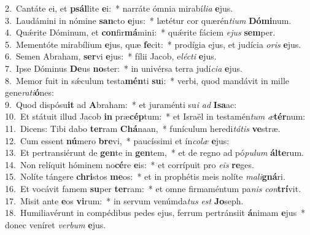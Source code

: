 {2.~}Cantáte ei, et \textbf{psál}lite \textbf{e}i:~* narráte ómnia mirabí\textit{li}\textit{a} \textbf{e}jus.\\
{3.~}Laudámini in nómine \textbf{san}cto \textbf{e}jus:~* lætétur cor quærén\textit{ti}\textit{um} \textbf{Dó}\textbf{mi}num.\\
{4.~}Quǽrite Dóminum, et \textbf{con}fir\textbf{má}mini:~* quǽrite fáciem \textit{e}\textit{jus} \textbf{sem}per.\\
{5.~}Mementóte mirabílium \textbf{e}jus, quæ \textbf{fe}cit:~* prodígia ejus, et judícia \textit{o}\textit{ris} \textbf{e}jus.\\
{6.~}Semen Abraham, \textbf{ser}vi \textbf{e}jus:~* fílii Jacob, e\textit{lé}\textit{cti} \textbf{e}jus.\\
{7.~}Ipse Dóminus \textbf{De}us \textbf{no}ster:~* in univérsa terra judí\textit{ci}\textit{a} \textbf{e}jus.\\
{8.~}Memor fuit in sǽculum testa\textbf{mén}ti \textbf{su}i:~* verbi, quod mandávit in mille gene\textit{ra}\textit{ti}\textbf{ó}nes:\\
{9.~}Quod dispósu\textbf{it} ad \textbf{A}braham:~* et juraménti su\textit{i} \textit{ad} \textbf{I}\textbf{sa}ac:\\
{10.~}Et státuit illud Jacob \textbf{in} præ\textbf{cép}tum:~* et Israël in testamén\textit{tum} \textit{æ}\textbf{tér}num:\\
{11.~}Dicens: Tibi dabo \textbf{ter}ram \textbf{Chá}naan,~* funículum heredi\textit{tá}\textit{tis} \textbf{ve}stræ.\\
{12.~}Cum essent \textbf{nú}mero \textbf{bre}vi,~* paucíssimi et ín\textit{co}\textit{læ} \textbf{e}jus:\\
{13.~}Et pertransiérunt de \textbf{gen}te in \textbf{gen}tem,~* et de regno ad pó\textit{pu}\textit{lum} \textbf{ál}\textbf{te}rum.\\
{14.~}Non relíquit hóminem no\textbf{cé}re \textbf{e}is:~* et corrípuit pro \textit{e}\textit{is} \textbf{re}ges.\\
{15.~}Nolíte tángere \textbf{chri}stos \textbf{me}os:~* et in prophétis meis nolíte \textit{ma}\textit{li}\textbf{gná}ri.\\
{16.~}Et vocávit famem \textbf{su}per \textbf{ter}ram:~* et omne firmaméntum pa\textit{nis} \textit{con}\textbf{trí}vit.\\
{17.~}Misit ante \textbf{e}os \textbf{vi}rum:~* in servum venúmda\textit{tus} \textit{est} \textbf{Jo}seph.\\
{18.~}Humiliavérunt in compédibus pedes ejus, ferrum pertránsiit \textbf{á}nimam \textbf{e}jus~* donec veníret \textit{ver}\textit{bum} \textbf{e}jus.\\

